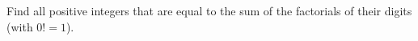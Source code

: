 Find all positive integers that are equal to the sum of the factorials of their digits (with $0!=1$).
